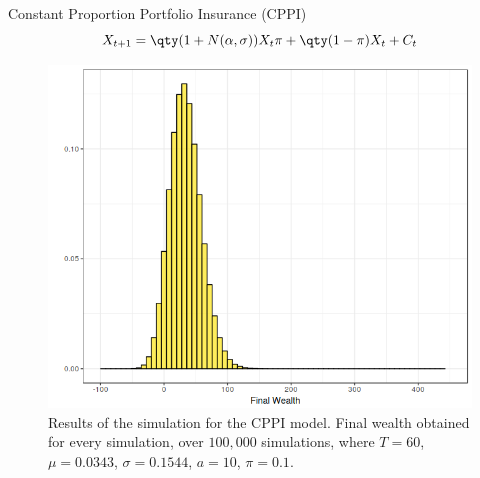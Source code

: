 \documentclass[10pt]{beamer}
\begin{document}
\begin{frame}[fragile]{Constant Proportion Portfolio
Insurance (CPPI)}
  \begin{equation*}
    X_{t+1} = \qty(1 + N(\alpha, \sigma))X_t \pi + \qty(1 - \pi)X_t + C_t
  \end{equation*}

  \begin{figure}[h]
    \centering
    \includegraphics[scale=0.3]{fw_cppi.png}
    \caption{Results of the simulation for the CPPI model. Final wealth obtained for every simulation, over $100,000$ simulations, where $T=60$, $\mu = 0.0343$, $\sigma = 0.1544$, $a=10$, $\pi = 0.1$.}
    \label{fig:fw_cppi}
\end{figure}
\end{frame}
\end{document}
